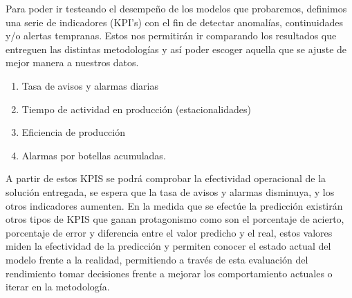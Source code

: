 \documentclass[10pt]{article}
\begin{document}
Para poder ir testeando el desempeño de los modelos que probaremos, definimos una serie de indicadores (KPI's) con el fin de detectar anomalías, continuidades y/o alertas tempranas. Estos nos permitirán ir comparando los resultados que entreguen las distintas metodologías y  así poder escoger aquella que se ajuste de mejor manera a nuestros datos.

\begin{enumerate}
    \item Tasa de avisos y alarmas diarias
    \item Tiempo de actividad en producción (estacionalidades)
    \item Eficiencia de producción
    \item Alarmas por botellas acumuladas.
\end{enumerate}

A partir de estos KPIS se podrá comprobar la efectividad operacional de la solución entregada, se espera que la tasa de avisos y alarmas disminuya, y los otros indicadores aumenten. En la medida que se efectúe la predicción existirán otros tipos de KPIS que ganan protagonismo como son el porcentaje de acierto, porcentaje de error y diferencia entre el valor predicho y el real, estos valores miden la efectividad de la predicción y permiten conocer el estado actual del modelo frente a la realidad, permitiendo a través de esta evaluación del rendimiento tomar decisiones frente a mejorar los comportamiento actuales o iterar en la metodología.

\end{document}
